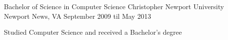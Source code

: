 

\begin{cventries}

  \cventry
    {Bachelor of Science in Computer Science} %
    {Christopher Newport University} %
    {Newport News, VA} %
    {September 2009 til May 2013} %
    {
      \begin{cvitems} %
        \item {Studied Computer Science and received a Bachelor's degree}
      \end{cvitems}
    }
\end{cventries}
